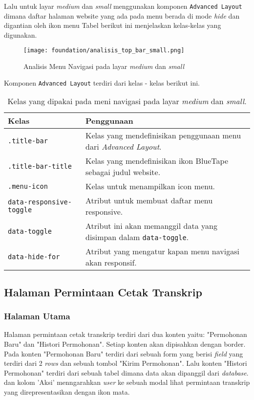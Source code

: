 Lalu untuk layar \textit{medium} dan \textit{small} menggunakan komponen \texttt{Advanced Layout} dimana  daftar halaman website yang ada pada menu berada di mode \textit{hide} dan digantian oleh ikon menu Tabel berikut ini menjelaskan kelas-kelas yang digunakan.\\

\begin{figure} [H]
	\centering  
	\texttt{[image: foundation/analisis\_top\_bar\_small.png]} 
	\caption{Analisis Menu Navigasi pada layar \textit{medium} dan \textit{small}} 
\end{figure} \noindent

Komponen \texttt{Advanced Layout} terdiri dari kelas - kelas berikut ini.

\begin{table}[H]
	\centering
	\begin{tabularx}{\textwidth}{lX}
		\toprule
		Kelas     & Penggunaan \\
		\midrule
		\texttt{.title-bar}  & Kelas yang mendefinisikan penggunaan menu dari \textit{Advanced Layout}.\\
		\texttt{.title-bar-title}	 & Kelas yang mendefinisikan ikon BlueTape sebagai judul website.\\		
		\texttt{.menu-icon} & Kelas untuk menampilkan icon menu.\\			
		\texttt{data-responsive-toggle} & Atribut untuk membuat daftar menu responsive.\\
		\texttt{data-toggle} & Atribut ini akan memanggil data yang disimpan dalam \texttt{data-toggle}.\\	
		\texttt{data-hide-for} & Atribut yang mengatur kapan menu navigasi akan responsif.\\
		\bottomrule
	\end{tabularx}%
	\caption{Kelas yang dipakai pada meni navigasi pada layar \textit{medium} dan \textit{small}.}
\end{table}%

\subsection{Halaman Permintaan Cetak Transkrip}
\subsubsection{Halaman Utama}

Halaman permintaan cetak transkrip terdiri dari dua konten yaitu: "Permohonan Baru" dan "Histori Permohonan". Setiap konten akan dipisahkan dengan border. Pada konten "Permohonan Baru" terdiri dari sebuah form yang berisi \textit{field} yang terdiri dari 2 \textit{rows} dan sebuah tombol "Kirim Permohonan". Lalu konten "Histori Permohonan" terdiri dari sebuah tabel dimana data akan dipanggil dari \textit{database}.  dan kolom 'Aksi' menngarahkan \textit{user} ke sebuah modal lihat permintaan transkrip yang direpresentasikan dengan ikon mata.

